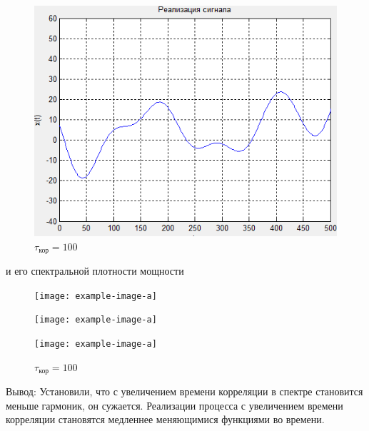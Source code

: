 \begin{figure}[H]
\begin{minipage}{0.3\linewidth}
    \includegraphics[width=\linewidth]{fig/fig1_t100}
	\caption*{$\tau_\text{кор}=100$}
\end{minipage}
  \end{figure}
и его спектральной плотности мощности
 \begin{figure}[H]
	\begin{minipage}{0.3\linewidth}
		\centering
		\texttt{[image: example-image-a]}
		\caption*{$\tau_\text{кор}=10$}
	\end{minipage}
	\begin{minipage}{0.3\linewidth}
		\centering
		\texttt{[image: example-image-a]}
		\caption*{$\tau_\text{кор}=30$}
	\end{minipage}
	\begin{minipage}{0.3\linewidth}
		\centering
		\texttt{[image: example-image-a]}
		\caption*{$\tau_\text{кор}=100$}
	\end{minipage}
\end{figure}
Вывод: Установили, что с увеличением времени корреляции в спектре становится меньше гармоник, он сужается. Реализации процесса с увеличением времени корреляции становятся медленнее меняющимися функциями во времени.

